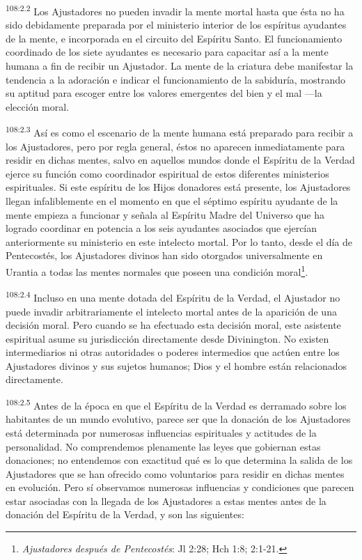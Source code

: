 \par
\textsuperscript{108:2.2} Los Ajustadores no pueden invadir la mente mortal hasta que ésta no ha sido debidamente preparada por el ministerio interior de los espíritus ayudantes de la mente, e incorporada en el circuito del Espíritu Santo. El funcionamiento coordinado de los siete ayudantes es necesario para capacitar así a la mente humana a fin de recibir un Ajustador. La mente de la criatura debe manifestar la tendencia a la adoración e indicar el funcionamiento de la sabiduría, mostrando su aptitud para escoger entre los valores emergentes del bien y el mal ---la elección moral.

\par
\textsuperscript{108:2.3} Así es como el escenario de la mente humana está preparado para recibir a los Ajustadores, pero por regla general, éstos no aparecen inmediatamente para residir en dichas mentes, salvo en aquellos mundos donde el Espíritu de la Verdad ejerce su función como coordinador espiritual de estos diferentes ministerios espirituales. Si este espíritu de los Hijos donadores está presente, los Ajustadores llegan infaliblemente en el momento en que el séptimo espíritu ayudante de la mente empieza a funcionar y señala al Espíritu Madre del Universo que ha logrado coordinar en potencia a los seis ayudantes asociados que ejercían anteriormente su ministerio en este intelecto mortal. Por lo tanto, desde el día de Pentecostés, los Ajustadores divinos han sido otorgados universalmente en Urantia a todas las mentes normales que poseen una condición moral\footnote{\textit{Ajustadores después de Pentecostés}: Jl 2:28; Hch 1:8; 2:1-21.}.

\par
\textsuperscript{108:2.4} Incluso en una mente dotada del Espíritu de la Verdad, el Ajustador no puede invadir arbitrariamente el intelecto mortal antes de la aparición de una decisión moral. Pero cuando se ha efectuado esta decisión moral, este asistente espiritual asume su jurisdicción directamente desde Divinington. No existen intermediarios ni otras autoridades o poderes intermedios que actúen entre los Ajustadores divinos y sus sujetos humanos; Dios y el hombre están relacionados directamente.

\par
\textsuperscript{108:2.5} Antes de la época en que el Espíritu de la Verdad es derramado sobre los habitantes de un mundo evolutivo, parece ser que la donación de los Ajustadores está determinada por numerosas influencias espirituales y actitudes de la personalidad. No comprendemos plenamente las leyes que gobiernan estas donaciones; no entendemos con exactitud qué es lo que determina la salida de los Ajustadores que se han ofrecido como voluntarios para residir en dichas mentes en evolución. Pero sí observamos numerosas influencias y condiciones que parecen estar asociadas con la llegada de los Ajustadores a estas mentes antes de la donación del Espíritu de la Verdad, y son las siguientes:

